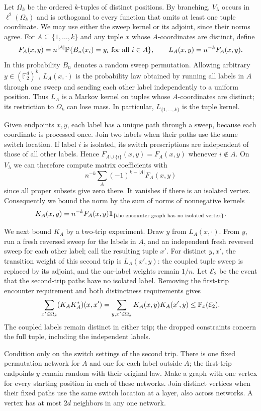 Let $\Omega_k$ be the ordered $k$-tuples of distinct positions. By
branching, $V_\lambda$ occurs in $\ell^2(\Omega_k)$ and is orthogonal
to every function that omits at least one tuple coordinate. We may
use either the sweep kernel or its adjoint, since their norms agree.
For $A\subseteq\{1,\ldots,k\}$ and any tuple $x$ whose
$A$-coordinates are distinct, define
\[
 F_A(x,y)=n^{|A|}\mathbb P\{B_n(x_i)=y_i\text{ for all }i\in A\},
 \qquad L_A(x,y)=n^{-k}F_A(x,y).
\]
In this probability $B_n$ denotes a random sweep permutation.
Allowing arbitrary $y\in(\mathbb F_2^d)^k$, $L_A(x,\cdot)$ is the
probability law obtained by running all labels in $A$ through one
sweep and sending each other label independently to a uniform
position. Thus $L_A$ is a Markov kernel on tuples whose $A$-coordinates
are distinct; its restriction to $\Omega_k$ can lose mass.
In particular, $L_{\{1,\ldots,k\}}$ is the tuple kernel.

Given endpoints $x,y$, each label has a unique path through a sweep,
because each coordinate is processed once. Join two labels when
their paths use the same switch location. If label $i$ is isolated,
its switch prescriptions are independent of those of all other
labels. Hence $F_{A\cup\{i\}}(x,y)=F_A(x,y)$ whenever $i\notin A$.
On $V_\lambda$ we can therefore compute matrix coefficients with
\[
 n^{-k}\sum_A (-1)^{k-|A|} F_A(x,y)
\]
since all proper subsets give zero there. It vanishes if there is an isolated vertex. Consequently we bound the norm by the sum of norms of nonnegative
kernels
\[
 K_A(x,y)=n^{-k}F_A(x,y)
                 {\bf1}_{\{\text{the encounter graph has no isolated vertex}\}}.
\]

We next bound $K_A$ by a two-trip experiment. Draw $y$ from
$L_A(x,\cdot)$. From $y$, run a fresh reversed sweep for the labels
in $A$, and an independent fresh reversed sweep for each other label;
call the resulting tuple $x'$. For distinct $y,x'$, the transition
weight of this second trip is $L_A(x',y)$: the coupled tuple sweep
is replaced by its adjoint, and the one-label weights remain $1/n$.
Let $\mathcal E_2$ be the event that the second-trip paths have no
isolated label. Removing the first-trip encounter requirement and
both distinctness requirements gives
\[
 \sum_{x'\in\Omega_k}(K_AK_A^*)(x,x')
 =\sum_{y,x'\in\Omega_k}K_A(x,y)K_A(x',y)
 \le\mathbb P_x(\mathcal E_2).
\]
The coupled labels remain distinct in either trip; the dropped
constraints concern the full tuple, including the independent labels.

Condition only on the switch settings of the second trip. There is
one fixed permutation network for $A$ and one for each label outside
$A$; the first-trip endpoints $y$ remain random with their original
law. Make a graph with one vertex for every starting position in
each of these networks. Join distinct vertices when their fixed
paths use the same switch location at a layer, also across networks.
A vertex has at most $2d$ neighbors in any one network.

